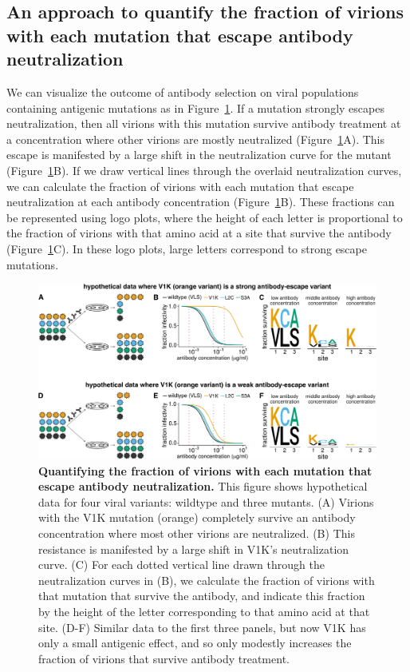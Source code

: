\documentclass[11pt]{article}
\begin{document}
\subsection*{An approach to quantify the fraction of virions with each mutation that escape antibody neutralization}
We can visualize the outcome of antibody selection on viral populations containing antigenic mutations as in Figure~\ref{fig:fracsurvive_example}.
If a mutation strongly escapes neutralization, then all virions with this mutation survive antibody treatment at a concentration where other virions are mostly neutralized (Figure~\ref{fig:fracsurvive_example}A).
This escape is manifested by a large shift in the neutralization curve for the mutant (Figure~\ref{fig:fracsurvive_example}B).
If we draw vertical lines through the overlaid neutralization curves, we can calculate the fraction of virions with each mutation that escape neutralization at each antibody concentration (Figure~\ref{fig:fracsurvive_example}B).
These fractions can be represented using logo plots, where the height of each letter is proportional to the fraction of virions with that amino acid at a site that survive the antibody (Figure~\ref{fig:fracsurvive_example}C).
In these logo plots, large letters correspond to strong escape mutations. 

\begin{figure}
\centerline{\includegraphics[width=\textwidth]{figs/fracsurvive_example/fracsurvive_fig.pdf}}
\caption{\label{fig:fracsurvive_example}
{\bf Quantifying the fraction of virions with each mutation that escape antibody neutralization.}
This figure shows hypothetical data for four viral variants: wildtype and three mutants.
(A) Virions with the V1K mutation (orange) completely survive an antibody concentration where most other virions are neutralized.
(B) This resistance is manifested by a large shift in V1K's neutralization curve.
(C) For each dotted vertical line drawn through the neutralization curves in (B), we calculate the fraction of virions with that mutation that survive the antibody, and indicate this fraction by the height of the letter corresponding to that amino acid at that site.
(D-F) Similar data to the first three panels, but now V1K has only a small antigenic effect, and so only modestly increases the fraction of virions that survive antibody treatment.
}
\end{figure}
\end{document}
